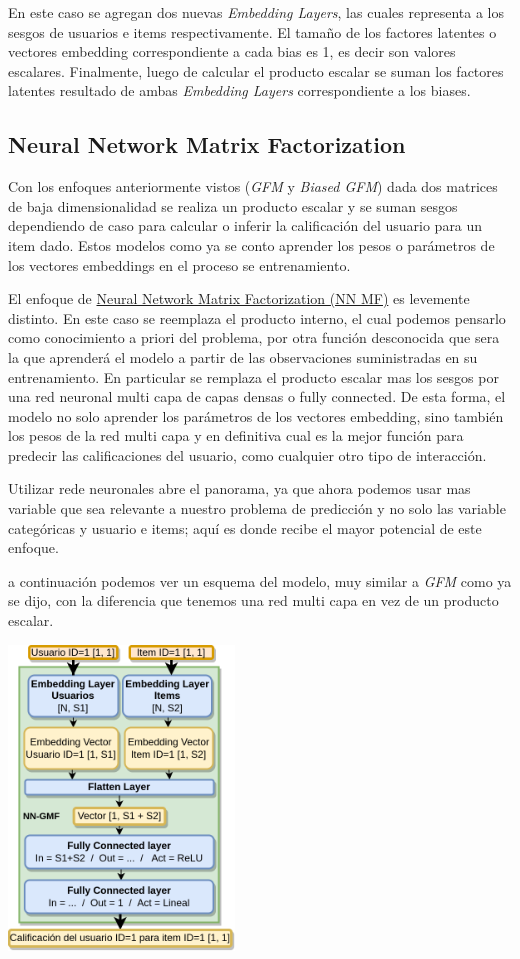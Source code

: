 \documentclass[11pt,a4paper,twoside]{thesis}
\begin{document}
En este caso se agregan dos nuevas \textit{Embedding Layers}, las cuales representa a los sesgos de usuarios e items respectivamente. El tamaño de los factores latentes o vectores embedding correspondiente a cada bias es 1, es decir son valores escalares. Finalmente, luego de calcular el producto escalar se suman los factores latentes resultado de ambas \textit{Embedding Layers} correspondiente a los biases.  


\subsection{Neural Network Matrix Factorization}

Con los enfoques anteriormente vistos (\textit{GFM} y \textit{Biased GFM}) dada dos matrices de baja dimensionalidad se realiza un producto escalar y se suman sesgos dependiendo de caso para calcular o inferir la calificación del usuario para un item dado. Estos modelos como ya se conto aprender los pesos o parámetros de los vectores embeddings en el proceso se entrenamiento. 

El enfoque de \href{https://arxiv.org/pdf/1511.06443.pdf}{Neural Network Matrix Factorization (NN MF)} es levemente distinto. En este caso se reemplaza el producto interno, el cual podemos pensarlo como conocimiento a priori del problema, por otra función desconocida que sera la que aprenderá el modelo a partir de las observaciones suministradas en su entrenamiento. En particular se remplaza el producto escalar mas los sesgos por una red neuronal multi capa de capas densas o fully connected. De esta forma, el modelo no solo aprender los parámetros de los vectores embedding, sino también los pesos de la red multi capa y en definitiva cual es la mejor función para predecir las calificaciones del usuario, como cualquier otro tipo de interacción.

Utilizar rede neuronales abre el panorama, ya que ahora podemos usar mas variable que sea relevante a nuestro problema de predicción y no solo las variable categóricas y usuario e items; aquí es donde recibe el mayor potencial de este enfoque.

a continuación podemos ver un esquema del modelo, muy similar a \textit{GFM} como ya se dijo, con la diferencia que tenemos una red multi capa en vez de un producto escalar.

\begin{center}
	\includegraphics[width=6cm]{./images/NN-MF.png}
\end{center}
\end{document}
